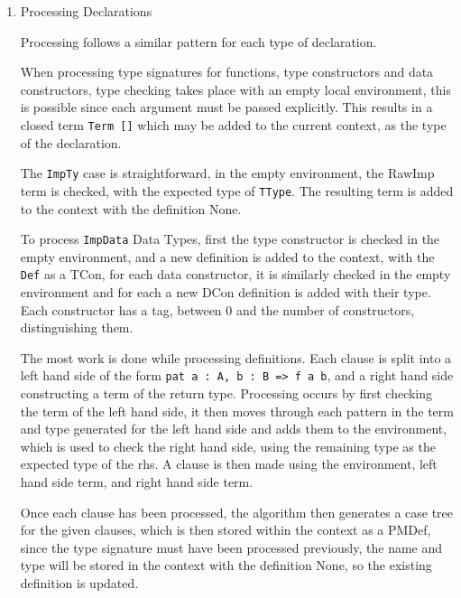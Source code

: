 \documentclass[a4paper]{article}
\begin{document}
\begin{enumerate}
\item Processing Declarations
\label{sec:orgf0c522c}

Processing follows a similar pattern for each type of declaration. 

When processing type signatures for functions, type constructors and
data constructors, type checking takes place with an empty local environment, this is possible since each argument must be passed explicitly. This results in a closed term \texttt{Term []} which may be added to the
current context, as the type of the declaration. 

The \texttt{ImpTy} case is straightforward, in the empty environment, the
RawImp term is checked, with the expected type of \texttt{TType}.
The resulting term is added to the context with the definition None. 

To process \texttt{ImpData} Data Types, first the type constructor is checked
in the empty environment, and a new definition is added to the context,
with the \texttt{Def} as a TCon, for each data constructor, it is similarly 
checked in the empty environment and for each a new DCon definition is 
added with their type. Each constructor has a tag, between 0 and the
number of constructors, distinguishing them.  

The most work is done while processing definitions. Each clause is
split into a left hand side of the form \texttt{pat a : A, b : B => f a b},
and a right hand side constructing a term of the return type. Processing
occurs by first checking the term of the left hand side, it then moves 
through each pattern in the term and type generated for the left hand
side and adds them to the environment, which is used to check the right
hand side, using the remaining type as the expected type of the rhs. 
A clause is then made using the environment, left hand side term, and right 
hand side term. 

Once each clause has been processed, the algorithm then generates a 
case tree for the given clauses, which is then stored within the context
as a PMDef, since the type signature must have been processed previously, 
the name and type will be stored in the context with the definition None, 
so the existing definition is updated.
\end{enumerate}
\end{document}
